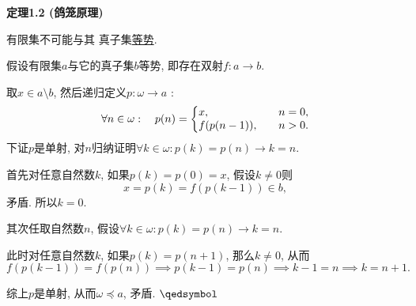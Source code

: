\documentclass[UTF8]{ctexart}
\begin{document}
\vspace{10pt}

\hypertarget{sec:定理1.2}{}
\noindent\textbf{定理1.2 (鸽笼原理)}

有限集不可能与其
真子集\href{../../02 集合的一般构造/06 势关系#nameddest=sec:定义1.1}{等势}.



假设有限集$a$与它的真子集$b$等势, 即存在双射$f:a\to b$.

取$x\in a\setminus b$, 然后递归定义$p:\omega\to a$ :
\[\forall n\in\omega:\quad p(n)=\left\{\begin{aligned}
    &x,\quad&&n=0,\\[-3pt]
    &f(p(n-1)),\quad&&n>0.
\end{aligned}\right.\\[3pt]\]
下证$p$是单射,
对$n$归纳证明$\forall k\in\omega:p(k)=p(n)\to k=n$.

首先对任意自然数$k$, 如果$p(k)=p(0)=x$, 假设$k\neq 0$则
\[
    x=p(k)=f(p(k-1))\in b,
\]
矛盾. 所以$k=0$.

其次任取自然数$n$, 假设$\forall k\in\omega:p(k)=p(n)\to k=n$.

此时对任意自然数$k$, 如果$p(k)=p(n+1)$, 那么$k\neq 0$, 从而
\[
    f(p(k-1))=f(p(n))\implies p(k-1)=p(n)\implies k-1=n\implies k=n+1.
\]

综上$p$是单射, 从而$\omega\preccurlyeq a$, 矛盾. \hfill $\qedsymbol$

\end{document}
